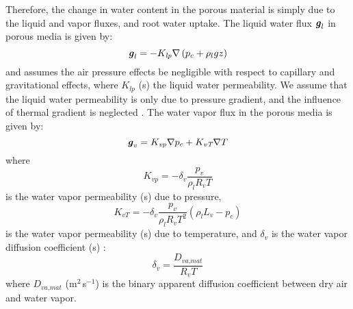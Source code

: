 Therefore, the change in water content in the porous material is simply due to the liquid and vapor fluxes, and root water uptake. The liquid water flux $\textbf{\textit{g}}_l$ in porous media is given by:
\begin{equation}
\textbf{\textit{g}}_l = - K_{\textit{lp}} \nabla \left(p_c + \rho_l g z\right)
\end{equation}
and assumes the air pressure effects be negligible with respect to capillary and gravitational effects, where $K_{\textit{lp}}$ (s) the liquid water permeability. We assume that the liquid water permeability is only due to pressure gradient, and the influence of thermal gradient is neglected \citep{Carmeliet2005}. The water vapor flux in the porous media is given by:
\begin{equation}
\textbf{\textit{g}}_v = K_{\textit{vp}}\nabla p_c + K_{\textit{vT}}\nabla T
\end{equation}
where
\begin{equation}
K_{\textit{vp}} = - \delta_v \frac{p_v}{\rho_l R_v T}
\end{equation}
is the water vapor permeability (s) due to pressure, 
\begin{equation}
K_{\textit{vT}} = - \delta_v \frac{p_v}{\rho_l R_v T^2}\left(\rho_l L_v - p_c\right)
\end{equation}
is the water vapor permeability (s) due to temperature, and $\delta_v$ is the water vapor diffusion coefficient (s) \citep{Carmeliet2005, Defraeye2011, Saneinejad2013, Kubilay2014b}:
\begin{equation}
\delta_v = \frac{D_{\textit{va,mat}}}{R_v T}
\end{equation}
where $D_{\textit{va,mat}}$ (m$^2$\,s$^{-1}$) is the binary apparent diffusion coefficient between dry air and water vapor.

